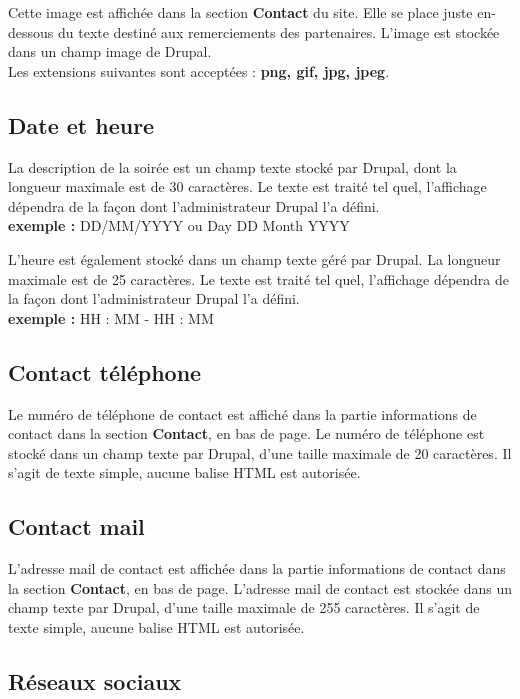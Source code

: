\documentclass[11pt]{report}
\begin{document}
Cette image est affichée dans la section \textbf{Contact} du site. Elle se place
juste en-dessous du texte destiné aux remerciements des partenaires.
L'image est stockée dans un champ image de Drupal. \\
Les extensions suivantes sont acceptées : \textbf{png, gif, jpg, jpeg}.

\subsection{Date et heure}

La description de la soirée est un champ texte stocké par Drupal, dont la longueur
maximale est de 30 caractères. Le texte est traité tel quel, l'affichage dépendra
de la façon dont l'administrateur Drupal l'a défini. \\
\textbf{exemple :} DD/MM/YYYY ou Day DD Month YYYY


L'heure est également stocké dans un champ texte géré par Drupal. La longueur
maximale est de 25 caractères. Le texte est traité tel quel, l'affichage dépendra
de la façon dont l'administrateur Drupal l'a défini. \\
\textbf{exemple :} HH : MM - HH : MM

\subsection{Contact téléphone}

Le numéro de téléphone de contact est affiché dans la partie informations de
contact dans la section \textbf{Contact}, en bas de page.
Le numéro de téléphone est stocké dans un champ texte par Drupal, d'une taille
maximale de 20 caractères. Il s'agit de texte simple, aucune balise HTML est autorisée.

\subsection{Contact mail}

L'adresse mail de contact est affichée dans la partie informations de
contact dans la section \textbf{Contact}, en bas de page.
L'adresse mail de contact est stockée dans un champ texte par Drupal, d'une taille
maximale de 255 caractères. Il s'agit de texte simple, aucune balise HTML est autorisée.

\subsection{Réseaux sociaux}
\end{document}
